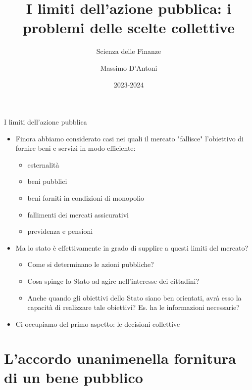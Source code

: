 \documentclass[11pt]{beamer}
\institute{Università di Siena}
\author{Massimo D'Antoni}
\date{2023-2024}
\title{I limiti dell'azione pubblica: \newline i problemi delle scelte collettive}
\subtitle{Scienza delle Finanze}
\begin{document}
\maketitle


\begin{frame}{I limiti dell'azione pubblica}
\begin{itemize}
\item Finora abbiamo considerato casi nei quali il mercato "fallisce" l'obiettivo
di fornire beni e servizi in modo efficiente:
\begin{itemize}
\item esternalità
\item beni pubblici
\item beni forniti in condizioni di monopolio
\item fallimenti dei mercati assicurativi
\item previdenza e pensioni
\end{itemize}
\item Ma lo stato è effettivamente in grado di supplire a questi limiti del mercato?
\begin{itemize}
\item Come si determinano le azioni pubbliche?
\item Cosa spinge lo Stato ad agire nell'interesse dei cittadini?
\item Anche quando gli obiettivi dello Stato siano ben orientati, avrà esso la
capacità di realizzare tale obiettivi? Es. ha le informazioni necessarie?
\end{itemize}
\item Ci occupiamo del primo aspetto: le decisioni collettive
\end{itemize}
\end{frame}

\section{L'accordo unanime\newline nella fornitura di un bene pubblico}
\end{document}
